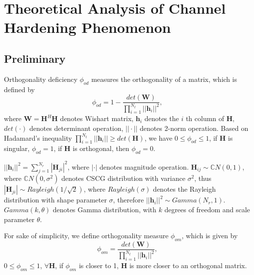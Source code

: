 \documentclass[12pt, draftclsnofoot, onecolumn]{IEEEtran}
\begin{document}
 
\section{Theoretical Analysis of Channel Hardening Phenomenon}
\subsection{Preliminary}
Orthogonality deficiency $\phi_{od}$ measures the orthogonality of a matrix\cite{ma2008performance}, which is defined by
\begin{equation}
\phi_{od}=1-\frac{det(\mathbf{W})}{\prod_{i=1}^{N_{t}}||\mathbf{h}_{i}||^{2}},
\label{OD}
\end{equation}
where $\mathbf{W}=\mathbf{H}^{H}\mathbf{H}$ denotes Wishart matrix, $\mathbf{h}_{i}$ denotes the $i$ th column of $\mathbf{H}$, $det(\cdot)$ denotes determinant operation, $||\cdot||$ denotes 2-norm operation. Based on Hadamard's inequality $\prod_{i=1}^{N_{t}}||\mathbf{h}_{i}||\geq det(\mathbf{H})$, we have $0\leq\phi_{od}\leq 1$, if $\mathbf{H}$ is singular, $\phi_{od}=1$, if $\mathbf{H}$ is orthogonal, then $\phi_{od}=0$.

$||\mathbf{h}_{i}||^{2}=\sum_{j=1}^{N_{r}}|\mathbf{H}_{ji}|^{2}$, where $|\cdot|$ denotes magnitude operation. $\mathbf{H}_{ij}\sim \mathbb{C}N(0,1)$, where $\mathbb{C}N(0, \sigma^{2})$ denotes CSCG distribution with variance $\sigma^{2}$, thus $|\mathbf{H}_{ji}|\sim Rayleigh(1/\sqrt{2})$, where $Rayleigh(\sigma)$ denotes the Rayleigh distribution with shape parameter $\sigma$, therefore $||\mathbf{h}_{i}||^{2}\sim Gamma(N_{r},1)$\cite{papoulis2002probability}. $Gamma(k,\theta)$ denotes Gamma distribution, with $k$ degrees of freedom and scale parameter $\theta$.

For sake of simplicity, we define orthogonality measure $\phi_{om}$, which is given by 
\begin{equation}
\phi_{om}=\frac{det(\mathbf{W})}{\prod_{i=1}^{N_{t}}||\mathbf{h}_{i}||^{2}},
\label{OM}
\end{equation}
$0\leq \phi_{om}\leq 1$, $\forall \mathbf{H}$, if $\phi_{om}$ is closer to 1, $\mathbf{H}$ is more closer to an orthogonal matrix. 
\end{document}
